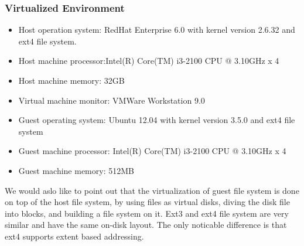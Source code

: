 \subsubsection{Virtualized Environment}
\begin{itemize}
\item{}
Host operation system: RedHat Enterprise 6.0 with kernel version 2.6.32 and ext4 file system. 
\item{}
Host machine processor:Intel(R) Core(TM) i3-2100 CPU @ 3.10GHz x 4
\item{}
Host machine memory: 32GB
\item{}
Virtual machine monitor: VMWare Workstation 9.0
\item{}
Guest operating system: Ubuntu 12.04 with kernel version 3.5.0 and ext4 file system
\item{}
Guest machine processor: Intel(R) Core(TM) i3-2100 CPU @ 3.10GHz x 4
\item{}
Guest machine memory: 512MB
\end{itemize}

We would aslo like to point out that the virtualization of guest file system is done on top of the host file system, by using files as virtual disks, diving the disk file into blocks, and building a file system on it. Ext3 and ext4 file system are very similar and have the same on-disk layout.  The only noticable difference is that ext4 supports extent based addressing.

